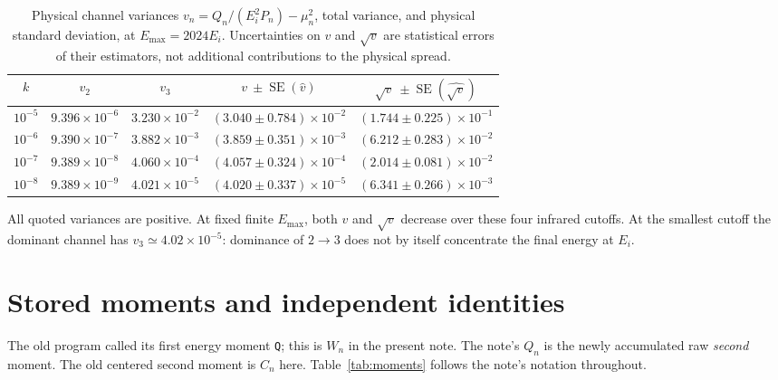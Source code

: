 \documentclass[10pt,a4paper]{article}
\newcommand{\SE}{\operatorname{SE}}
\begin{document}
\begin{table}[h!]
\centering\small
\caption{Physical channel variances $v_n=Q_n/(E_i^2P_n)-\mu_n^2$,
total variance, and physical standard deviation, at $E_{\max}=2024E_i$.
Uncertainties on $v$ and $\sqrt v$ are statistical errors of their
estimators, not additional contributions to the physical spread.}
\begin{tabular}{ccccc}
\toprule
$k$ & $v_2$ & $v_3$ & $v\ \pm\SE(\widehat v)$ &
$\sqrt v\ \pm\SE(\widehat{\sqrt v})$\\
\midrule
$10^{-5}$ & $9.396\times10^{-6}$ & $3.230\times10^{-2}$ & $(3.040\pm0.784)\times10^{-2}$ & $(1.744\pm0.225)\times10^{-1}$\\
$10^{-6}$ & $9.390\times10^{-7}$ & $3.882\times10^{-3}$ & $(3.859\pm0.351)\times10^{-3}$ & $(6.212\pm0.283)\times10^{-2}$\\
$10^{-7}$ & $9.389\times10^{-8}$ & $4.060\times10^{-4}$ & $(4.057\pm0.324)\times10^{-4}$ & $(2.014\pm0.081)\times10^{-2}$\\
$10^{-8}$ & $9.389\times10^{-9}$ & $4.021\times10^{-5}$ & $(4.020\pm0.337)\times10^{-5}$ & $(6.341\pm0.266)\times10^{-3}$\\
\bottomrule
\end{tabular}
\end{table}

All quoted variances are positive. At fixed finite $E_{\max}$, both $v$
and $\sqrt v$ decrease over these four infrared cutoffs. At the smallest
cutoff the dominant channel has $v_3\simeq4.02\times10^{-5}$: dominance
of $2\to3$ does not by itself concentrate the final energy at $E_i$.

\clearpage
\section{Stored moments and independent identities}
The old program called its first energy moment \texttt{Q}; this is
$W_n$ in the present note. The note's $Q_n$ is the newly accumulated raw
\emph{second} moment. The old centered second moment is $C_n$ here.
Table~\ref{tab:moments} follows the note's notation throughout.
\end{document}

